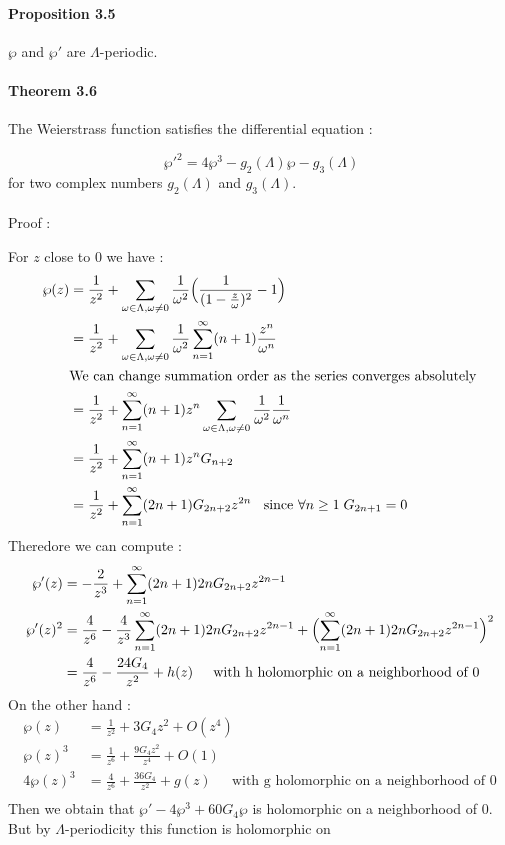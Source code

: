 \documentclass[letterpaper,10pt]{article}
\begin{document}
\paragraph{Proposition 3.5} $\wp$ and $\wp'$ are $\Lambda$-periodic.

\paragraph{Theorem 3.6} The Weierstrass function satisfies the differential equation : 

\[\ \wp'^2 = 4\wp^3 - g_2(\Lambda)\wp - g_3(\Lambda) \] for two complex numbers $g_2(\Lambda)$ and $g_3(\Lambda)$.

{\itshape \paragraph{} Proof :} For $z$ close to 0 we have : \begin{align*}
    \wp(z) &= \frac{1}{z^2} +  \sum_{\omega \in \Lambda , \omega \neq 0 }\frac{1}{\omega^2}  \Bigl(\frac{1}{(1 - \frac{z}{\omega})^2} - 1\Bigr) \\
     &=  \frac{1}{z^2} +  \sum_{\omega \in \Lambda , \omega \neq 0 }\frac{1}{\omega^2}  \sum_{n = 1}^\infty (n+1)\frac{z^n}{\omega^n}\\
     &\text{We can change summation order as the series converges absolutely}\\
     &=  \frac{1}{z^2} +  \sum_{n = 1}^\infty (n+1)z^n  \sum_{\omega \in \Lambda , \omega \neq 0 } \frac{1}{\omega^2}\frac{1}{\omega^n} \\
     &=  \frac{1}{z^2} +  \sum_{n = 1}^\infty (n+1)z^n G_{n+2}  \\
     &=  \frac{1}{z^2} +  \sum_{n = 1}^\infty (2n+1) G_{2n+2} z^{2n} \;\; \text{  since  } \forall n \geq 1 \; G_{2n+1} = 0  \\
\end{align*}
Theredore we can compute : \begin{align*}
  \wp'(z) &= -\frac{2}{z^3} + \sum_{n = 1}^\infty (2n+1)2n G_{2n+2} z^{2n-1} \\
  \wp'(z)^2 &= \frac{4}{z^6} - \frac{4}{z^3}\sum_{n = 1}^\infty (2n+1)2n G_{2n+2} z^{2n-1} + \Bigl(\sum_{n = 1}^\infty (2n+1)2n G_{2n+2} z^{2n-1}\Bigr)^2\\
  &= \frac{4}{z^6} - \frac{24G_4}{z^2} + h(z) \;\;\;\; \text{ with h holomorphic on a neighborhood of 0}
\end{align*} On the other hand :
\begin{align*}
  \wp(z) &= \frac{1}{z^2} + 3G_4z^2 + O(z^4) \\
  \wp(z)^3 &= \frac{1}{z^6} + \frac{9G_4z^2}{z^4} + O(1) \\
   4\wp(z)^3 &= \frac{4}{z^6} + \frac{36G_4}{z^2} + g(z)  \;\;\;\; \text{ with g holomorphic on a neighborhood of 0}\\
\end{align*} Then we obtain that $\wp' - 4\wp^3 + 60G_4\wp$ is holomorphic on a neighborhood of 0. But by $\Lambda$-periodicity this function is holomorphic on 
\end{document}
